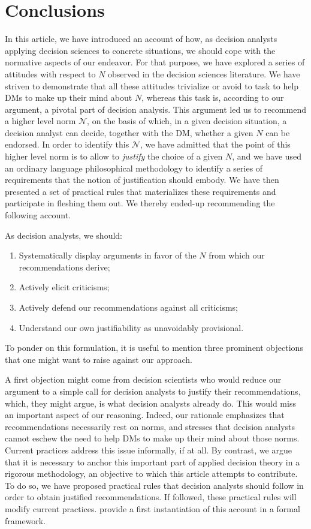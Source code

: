\documentclass[preprint, french, english, 11pt, authoryear]{elsarticle}%
\newcommand{\adv}{\mathscr{N}}
\begin{document}
\section{Conclusions}
\label{sec:concl}
In this article, we have introduced an account of how, as decision analysts applying decision sciences to concrete situations, we should cope with the normative aspects of our endeavor. For that purpose, we have explored a series of attitudes with respect to $N$ observed in the decision sciences literature. We have striven to demonstrate that all these attitudes trivialize or avoid to task to help \acp{DM} to make up their mind about $N$, whereas this task is, according to our argument, a pivotal part of decision analysis. This argument led us to recommend a higher level norm $\adv$, on the basis of which, in a given decision situation, a decision analyst can decide, together with the \ac{DM}, whether a given $N$ can be endorsed. In order to identify this $\adv$, we have admitted that the point of this higher level norm is to allow to \emph{justify} the choice of a given $N$, and we have used an ordinary language philosophical methodology to identify a series of requirements that the notion of justification should embody. We have then presented a set of practical rules that materializes these requirements and participate in fleshing them out. We thereby ended-up recommending the following account.

As decision analysts, we should:
\begin{enumerate}[label=\roman*.]
	\item Systematically display arguments in favor of the $N$ from which our recommendations derive;
	\item Actively elicit criticisms;
	\item Actively defend our recommendations against all criticisms;
	\item Understand our own justifiability as unavoidably provisional.
\end{enumerate}

To ponder on this formulation, it is useful to mention three prominent objections that one might want to raise against our approach.

A first objection might come from decision scientists who would reduce our argument to a simple call for decision analysts to justify their recommendations, which, they might argue, is what decision analysts already do. This would miss an important aspect of our reasoning. Indeed, our rationale emphasizes that recommendations necessarily rest on norms, and stresses that decision analysts cannot eschew the need to help \acp{DM} to make up their mind about those norms. Current practices address this issue informally, if at all. By contrast, we argue that it is necessary to anchor this important part of applied decision theory in a rigorous methodology, an objective to which this article attempts to contribute. To do so, we have proposed practical rules that decision analysts should follow in order to obtain justified recommendations. If followed, these practical rules will modify current practices. \citet{cailloux_formal_2018} provide a first instantiation of this account in a formal framework.
\end{document}
